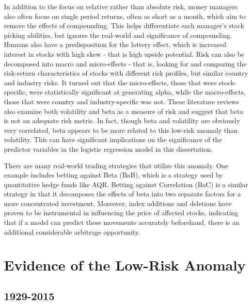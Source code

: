 \documentclass[12pt,twoside]{reedthesis}
\theoremstyle{definition}
\theoremstyle{definition}
\theoremstyle{definition}
\theoremstyle{remark}
\begin{document}
In addition to the focus on relative rather than absolute risk, money
managers also often focus on single period returns, often as short as a
month, which aim to remove the effects of compounding. This helps
differentiate each manager's stock picking abilities, but ignores the
real-world and significance of compounding. Humans also have a
predisposition for the lottery effect, which is increased interest in
stocks with high skew - that is high upside potential. Risk can also be
decomposed into macro and micro-effects - that is, looking for and
comparing the risk-return characteristics of stocks with different risk
profiles, but similar country and industry risks. It turned out that the
micro-effects, those that were stock-specific, were statistically
significant at generating alpha, while the macro-effects, those that
were country and industry-specific was not. These literature reviews
also examine both volatility and beta as a measure of risk and suggest
that beta is not an adequate risk metric. In fact, though beta and
volatility are obviously very correlated, beta appears to be more
related to this low-risk anomaly than volatility. This can have
significant implications on the significance of the predictor variables
in the logistic regression model in this dissertation.

There are many real-world trading strategies that utilize this anomaly.
One example includes betting against Beta (BaB), which is a strategy
used by quantitative hedge funds like AQR. Betting against Correlation
(BaC) is a similar strategy in that it decomposes the effects of beta
into two separate factors for a more concentrated investment. Moreover,
index additions and deletions have proven to be instrumental in
influencing the price of affected stocks, indicating that if a model can
predict these movements accurately beforehand, there is an additional
considerable arbitrage opportunity.

\section{Evidence of the Low-Risk
Anomaly}\label{evidence-of-the-low-risk-anomaly}

\subsection{1929-2015}\label{section}
\end{document}
